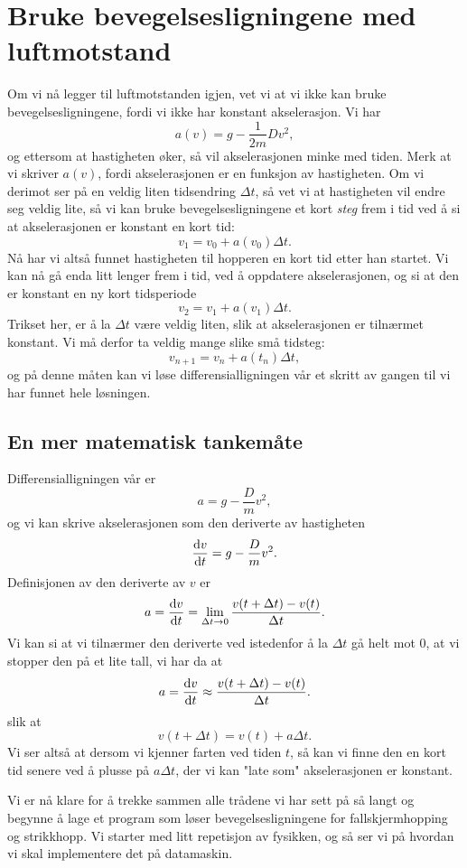 \documentclass[a4paper, 11pt, notitlepage]{article}
\renewcommand{\d}{{\rm d}}
\begin{document}
\section{Bruke bevegelsesligningene med luftmotstand}
Om vi nå legger til luftmotstanden igjen, vet vi at vi ikke kan bruke bevegelsesligningene, fordi vi ikke har konstant akselerasjon. Vi har
$$a(v) = g - \frac{1}{2m}Dv^2,$$
og ettersom at hastigheten øker, så vil akselerasjonen minke med tiden. Merk at vi skriver $a(v)$, fordi akselerasjonen er en funksjon av hastigheten. Om vi derimot ser på en veldig liten tidsendring $\Delta t$, så vet vi at hastigheten vil endre seg veldig lite, så vi kan bruke bevegelsesligningene et kort \emph{steg} frem i tid ved å si at akselerasjonen er konstant en kort tid:
$$v_1 = v_0 + a(v_0)\Delta t.$$
Nå har vi altså funnet hastigheten til hopperen en kort tid etter han startet. Vi kan nå gå enda litt lenger frem i tid, ved å oppdatere akselerasjonen, og si at den er konstant en ny kort tidsperiode
$$v_2 = v_1 + a(v_1)\Delta t.$$
Trikset her, er å la $\Delta t$ være veldig liten, slik at akselerasjonen er tilnærmet konstant. Vi må derfor ta veldig mange slike små tidsteg:
$$v_{n+1} = v_n + a(t_n)\Delta t,$$
og på denne måten kan vi løse differensialligningen vår et skritt av gangen til vi har funnet hele løsningen.

\subsection{En mer matematisk tankemåte}
Differensialligningen vår er
$$a = g - \frac{D}{m}v^2,$$
og vi kan skrive akselerasjonen som den deriverte av hastigheten
$$\frac{\d v}{\d t} = g - \frac{D}{m}v^2.$$
Definisjonen av den deriverte av $v$ er
$$a = \frac{\d v}{\d t} = \lim_{\Delta t \to 0} \frac{v(t+\Delta t)-v(t)}{\Delta t}.$$
Vi kan si at vi tilnærmer den deriverte ved istedenfor å la $\Delta t$ gå helt mot 0, at vi stopper den på et lite tall, vi har da at
$$a = \frac{\d v}{\d t} \approx \frac{v(t+\Delta t) - v(t)}{\Delta t}.$$
slik at
$$v(t+\Delta t) = v(t) + a\Delta t.$$
Vi ser altså at dersom vi kjenner farten ved tiden $t$, så kan vi finne den en kort tid senere ved å plusse på $a \Delta t$, der vi kan "late som" akselerasjonen er konstant.



Vi er nå klare for å trekke sammen alle trådene vi har sett på så langt og begynne å lage et program som løser bevegelsesligningene for fallskjermhopping og strikkhopp. Vi starter med litt repetisjon av fysikken, og så ser vi på hvordan vi skal implementere det på datamaskin.
\end{document}
